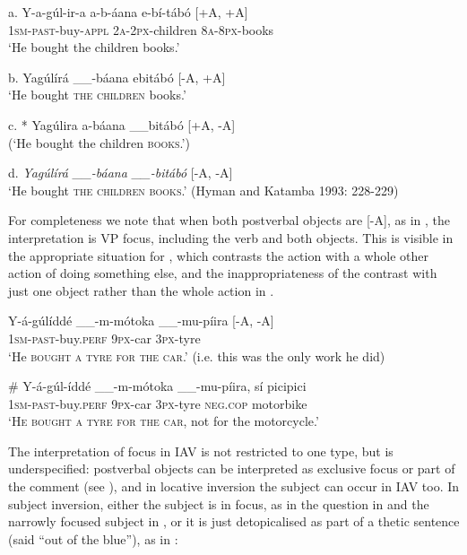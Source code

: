 \documentclass[output=paper]{langsci/langscibook}
\begin{document}
\ea
\gll a.  Y-a-gúl-ir-a      a-b-áana    e-bí-tábó  \textup{[+A, +A]}\\
       1\textsc{sm}-\textsc{past}-buy-\textsc{appl }   \textsc{2a-2px}-children  \textsc{8a-8px}-books\\
\glt   ‘He bought the children books.’             
\z

\ea
  b.  Yagúlírá \_\_-báana ebitábó            \textup{[-A, +A]} \\
\glt   ‘He bought \textsc{the children} books.’           
\z

\ea
  c.  * Yagúlira a-báana \_\_bitábó            \textup{[+A, -A]}\\
\glt   (‘He bought the children \textsc{books}.’)           
\z

\ea
\glt d.  \textit{Yagúlírá \_\_-báana \_\_-bitábó}            [-A, -A]\\
  ‘He bought \textsc{the children books}.’ (Hyman and Katamba 1993: 228-229)
\z

For completeness we note that when both postverbal objects are [-A], as in , the interpretation is VP focus, including the verb and both objects. This is visible in the appropriate situation for , which contrasts the action with a whole other action of doing something else, and the inappropriateness of the contrast with just one object rather than the whole action in .

\ea
\gll Y-á-gúlíddé    \_\_-m-mótoka    \_\_-mu-píira      \textup{[-A, -A]}\\
 \textsc{1sm-past}-buy.\textsc{perf}       \textsc{9px}-car              \textsc{3px}-tyre\\
\glt‘He \textsc{bought a tyre for the car}.’ (i.e. this was the only work he did) 
\z

\ea
\gll \# Y-á-gúl-íddé      \_\_-m-mótoka    \_\_-mu-píira,  sí    picipici\\
     \textsc{1sm-past}-buy.\textsc{perf   }    \textsc{9px}-car       \textsc{3px}-tyre   \textsc{neg}.\textsc{cop}  motorbike\\
\glt   ‘\textsc{He bought a tyre for the car}, not for the motorcycle.’
\z

The interpretation of focus in IAV is not restricted to one type, but is underspecified: postverbal objects can be interpreted as exclusive focus or part of the comment (see ), and in locative inversion the subject can occur in IAV too. In subject inversion, either the subject is in focus, as in the question in  and the narrowly focused subject in , or it is just detopicalised as part of a thetic sentence (said “out of the blue”), as in :
\end{document}
